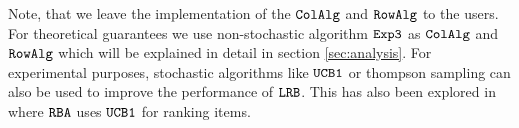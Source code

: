 

Note, that we leave the implementation of the ${\tt ColAlg}$ and ${\tt RowAlg}$ to the users. For theoretical guarantees we use non-stochastic algorithm ${\tt Exp3}$ as ${\tt ColAlg}$ and ${\tt RowAlg}$ which will be explained in detail in section \cref{sec:analysis}. For experimental purposes, stochastic algorithms like ${\tt UCB1}$ or thompson sampling can also be used to improve the performance of ${\tt LRB}$. This has also been explored in \citet{radlinski2008learning} where ${\tt RBA}$ uses ${\tt UCB1}$ for ranking items.



